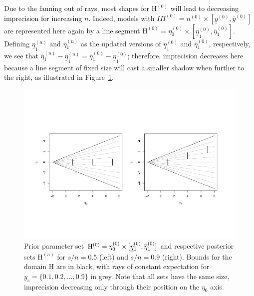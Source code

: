 \documentclass[runningheads,a4paper]{llncs}
\newcommand{\uz}{^{(0)}} %
\newcommand{\un}{^{(n)}} %
\newcommand{\ul}[1]{\underline{#1}}
\newcommand{\ol}[1]{\overline{#1}}
\def\yzl{\ul{y}\uz}
\def\yzu{\ol{y}\uz}
\def\nz{n\uz}
\def\PZ{I\!\!\Pi\uz}
\def\Eta{\mathrm{H}}
\def\EZ{\mathrm{H}\uz}
\def\EN{\mathrm{H}\un}
\def\ezz{\eta_0\uz}
\def\ezn{\eta_0\un}
\def\eozl{\ul{\eta}_1\uz}
\def\eozu{\ol{\eta}_1\uz}
\def\eonl{\ul{\eta}_1\un}
\def\eonu{\ol{\eta}_1\un}
\begin{document}
Due to the fanning out of rays, most shapes for $\EZ$ will lead to decreasing imprecision for increasing $n$.
Indeed, models with $\PZ = \nz \times [\yzl, \yzu]$
are represented here again by a line segment $\EZ = \ezz \times [\eozl,\eozu]$.
Defining $\eonl$ and $\eonu$ as the updated versions of $\eozl$ and $\eozu$, respectively,
we see that $\eonu-\eonl = \eozu-\eozl$;
therefore, imprecision decreases here because a line segment of fixed size
will cast a smaller shadow when further to the right,
as illustrated in Figure~\ref{fig:boatshape-vertical}.
\begin{figure}  %
\centering
\includegraphics[trim = 16mm 48mm 25mm 62mm, clip, width=\textwidth]{R/boatshape-vertical}%
\caption[Line segment parameter set $\EZ$ %
and respective posterior sets for $s/n=0.5$ and $s/n=0.9$.]%
{Prior parameter set $\EZ = \ezz \times [\text{\underline{$\eta$}${}_1\uz$},\eozu]$
and respective posterior sets $\EN$ for $s/n=0.5$ (left) and $s/n=0.9$ (right).
Bounds for the domain $\Eta$ are in black, with rays of constant expectation for $y_c = \{0.1,0.2,\ldots,0.9\}$ in grey. 
Note that all sets have the same size, imprecision decreasing only through their position on the $\eta_0$ axis.}
\label{fig:boatshape-vertical}
\end{figure}
\end{document}
